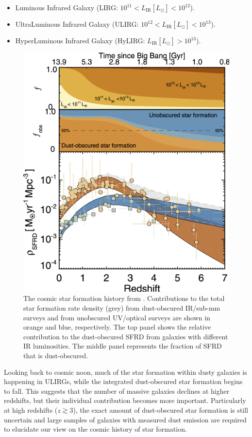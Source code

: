 \begin{itemize}
    \item Luminous Infrared Galaxy (LIRG: $10^{11} < L_\textrm{IR} [L_\odot] < 10^{12}$).
    \item UltraLuminous Infrared Galaxy (ULIRG: $10^{12} < L_\textrm{IR} [L_\odot] < 10^{13}$).
    \item HyperLuminous Infrared Galaxy (HyLIRG: $L_\textrm{IR} [L_\odot] > 10^{13}$).
\end{itemize}

\begin{figure}
    \centering
	\includegraphics[width=0.61\columnwidth]{Figures/cosmic_sfrd.pdf}
	\caption[Cosmic star formation history]{The cosmic star formation history from \citealt{Zavala_2021}. Contributions to the total star formation rate density (grey) from dust-obscured IR/sub-mm surveys and from unobscured UV/optical surveys are shown in orange and blue, respectively. The top panel shows the relative contribution to the dust-obscured SFRD from galaxies with different IR luminosities. The middle panel represents the fraction of SFRD that is dust-obscured.}
	\label{fig:cosmic_sfrd}
\end{figure}

Looking back to cosmic noon, much of the star formation within dusty galaxies is happening in ULIRGs, while the integrated dust-obscured star formation begins to fall. This suggests that the number of massive galaxies declines at higher redshifts, but their individual contribution becomes more important. Particularly at high redshifts ($z \gtrsim 3$), the exact amount of dust-obscured star formation is still uncertain and large samples of galaxies with measured dust emission are required to elucidate our view on the cosmic history of star formation.

